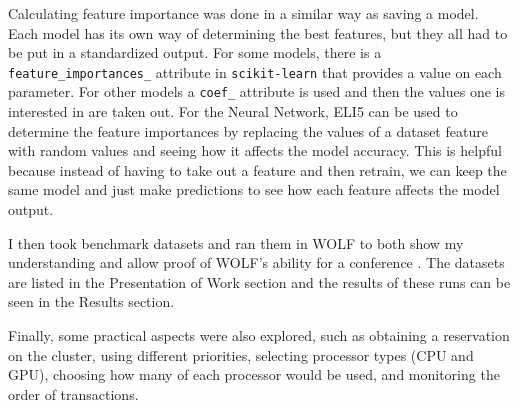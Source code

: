Calculating feature importance was done in a similar way as saving a model. Each model has its own way of determining the best features, but they all had to be put in a standardized output. For some models, there is a {\tt feature\_importances\_} attribute in {\tt scikit-learn} \parencite{sklearn} that provides a value on each parameter. For other models a {\tt coef\_} attribute is used and then the values one is interested in are taken out. For the Neural Network, ELI5 \parencite{eli5} can be used to determine the feature importances by replacing the values of a dataset feature with random values and seeing how it affects the model accuracy. This is helpful because instead of having to take out a feature and then retrain, we can keep the same model and just make predictions to see how each feature affects the model output.

I then took benchmark datasets and ran them in WOLF to both show my understanding and allow proof of WOLF's ability for a conference \parencite{WOLFpresentation}. The datasets are listed in the Presentation of Work section and the results of these runs can be seen in the Results section.

Finally, some practical aspects were also explored, such as obtaining a reservation on the cluster, using different priorities, selecting processor types (CPU and GPU), choosing how many of each processor would be used, and monitoring the order of transactions.